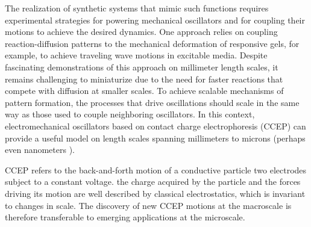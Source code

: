 The realization of synthetic systems that mimic such functions requires experimental strategies for powering mechanical oscillators and for coupling their motions to achieve the desired dynamics. One approach relies on coupling reaction-diffusion patterns to the mechanical deformation of responsive gels, for example, to achieve traveling wave motions in excitable media\autocite{Yashin2012,Masuda2016}. Despite fascinating demonstrations of this approach on millimeter length scales, it remains challenging to miniaturize due to the need for faster reactions that compete with diffusion at smaller scales. To achieve scalable mechanisms of pattern formation, the processes that drive oscillations should scale in the same way as those used to couple neighboring oscillators. In this context, electromechanical oscillators based on contact charge electrophoresis (CCEP) \autocite{bishop2018contact, drews2015contact} can provide a useful model on length scales spanning millimeters\autocite{Mersch2011} to microns\autocite{Dou2016} (perhaps even nanometers \autocite{Park2000,Kowalik2016}). 

CCEP refers to the back-and-forth motion of a conductive particle  two electrodes subject to a constant voltage.  the charge acquired by the particle and the forces driving its motion are well described by classical electrostatics, which is invariant to changes in scale. The discovery of new CCEP motions at the macroscale is therefore transferable to emerging applications at the microscale\autocite{bishop2018contact}.

